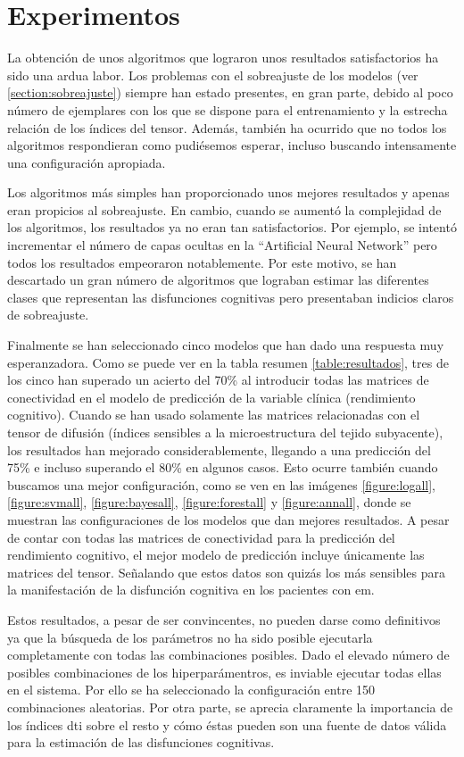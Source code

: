 
\section{Experimentos}
La obtención de unos algoritmos que lograron unos resultados satisfactorios ha sido una ardua labor. Los problemas con el sobreajuste de los modelos (ver \ref{section:sobreajuste}) siempre han estado presentes, en gran parte, debido al poco número de ejemplares con los que se dispone para el entrenamiento y la estrecha relación de los índices del tensor. Además, también ha ocurrido que no todos los algoritmos respondieran como pudiésemos esperar, incluso buscando intensamente una configuración apropiada.

Los algoritmos más simples han proporcionado unos mejores resultados y apenas eran propicios al sobreajuste. En cambio, cuando se aumentó la complejidad de los algoritmos, los resultados ya no eran tan satisfactorios. Por ejemplo, se intentó incrementar el número de capas ocultas en la ``Artificial Neural Network'' pero todos los resultados empeoraron notablemente. Por este motivo, se han descartado un gran número de algoritmos que lograban estimar las diferentes clases que representan las disfunciones cognitivas pero presentaban indicios claros de sobreajuste.

Finalmente se han seleccionado cinco modelos que han dado una respuesta muy esperanzadora. Como se puede ver en la tabla resumen \ref{table:resultados}, tres de los cinco han superado un acierto del 70\% al introducir todas las matrices de conectividad en el modelo de predicción de  la variable clínica (rendimiento cognitivo). Cuando se han usado solamente las matrices relacionadas con el tensor de difusión (índices sensibles a la microestructura del tejido subyacente), los resultados han mejorado considerablemente, llegando a una predicción del 75\% e incluso superando el 80\% en algunos casos. Esto ocurre también cuando buscamos una mejor configuración, como se ven en las imágenes 
\ref{figure:logall}, 
\ref{figure:svmall}, 
\ref{figure:bayesall}, 
\ref{figure:forestall} y
\ref{figure:annall}, donde se muestran las configuraciones de los modelos que dan mejores resultados.  A pesar de contar con todas las matrices de conectividad para la predicción del rendimiento cognitivo, el mejor modelo de predicción incluye únicamente las matrices del tensor. Señalando que estos datos son quizás los más sensibles para la manifestación de la disfunción cognitiva en los pacientes con \gls{em}.

Estos resultados, a pesar de ser convincentes, no pueden darse como definitivos ya que la búsqueda de los parámetros no ha sido posible ejecutarla completamente con todas las combinaciones posibles. Dado el elevado número de posibles combinaciones de los hiperparámentros, es inviable ejecutar todas ellas en el sistema. Por ello se ha seleccionado la configuración entre 150 combinaciones aleatorias. Por otra parte, se aprecia claramente la importancia de los índices \gls{dti} sobre el resto y cómo éstas pueden son una fuente de datos válida para la estimación de las disfunciones cognitivas.

